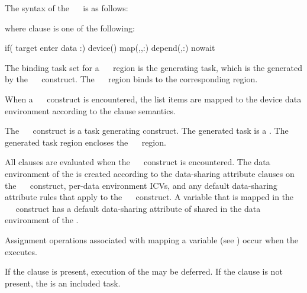 \begin{fortranspecific}
The syntax of the ~~ is as follows:
where clause is one of the following:
\begin{indentedcodelist}
if(\plc{[} target enter data :\plc{] scalar-logical-expression})
device()
map(\plc{[map-type-modifier[},\plc{] [map-type-modifier[},\plc{] ...] map-type}:)
depend(\plc{[depend-modifier},\plc{] dependence-type }:)
nowait
\end{indentedcodelist}
\end{fortranspecific}

\binding
The binding task set for a ~~ region is
the generating task, which is the  generated by the
~~ construct. The
~~ region binds to the corresponding
 region.

\descr
When a ~~ construct is encountered, the 
list items are mapped to the device data environment according to the  
clause semantics.

The ~~ construct is a task generating 
construct.  The generated task is a .  The generated task 
region encloses the ~~ region.

All clauses are evaluated when the ~~ 
construct is encountered.  The data environment of the  
is created according to the data-sharing attribute clauses on the 
~~ construct, per-data environment ICVs, 
and any default data-sharing attribute rules that apply to the 
~~ construct.  A variable that is 
mapped in the ~~ construct has a 
default data-sharing attribute of shared in the data environment of 
the .

Assignment operations associated with mapping a variable (see 
) occur when the  executes.

If the  clause is present, execution of the  
may be deferred.  If the  clause is not present, the 
 is an included task.


